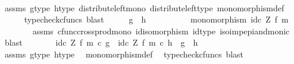 \begin{isabellebody}
\ \ \ \ \isamarkupfalse%
\ assms\ g{\isacharunderscore}{\kern0pt}type\ h{\isacharunderscore}{\kern0pt}type\ distribute{\isacharunderscore}{\kern0pt}left{\isacharunderscore}{\kern0pt}mono\ distribute{\isacharunderscore}{\kern0pt}left{\isacharunderscore}{\kern0pt}type\ monomorphism{\isacharunderscore}{\kern0pt}def{}\isanewline
\ \ \ \ \isamarkupfalse%
\ {\isacharparenleft}{\kern0pt}typecheck{\isacharunderscore}{\kern0pt}cfuncs{\isacharcomma}{\kern0pt}\ blast{\isacharparenright}{\kern0pt}\isanewline
\ \ \isamarkupfalse%
\ \isamarkupfalse%
\ {\isachardoublequoteopen}g\ {\isacharequal}{\kern0pt}\ h{\isachardoublequoteclose}\isanewline
\ \ \isamarkupfalse%
\ {\isacharminus}{\kern0pt}\isanewline
\ \ \ \ \isamarkupfalse%
\ {\isachardoublequoteopen}monomorphism\ {\isacharparenleft}{\kern0pt}id\isactrlsub c\ Z\ {\isasymtimes}\isactrlsub f\ m{\isacharparenright}{\kern0pt}{\isachardoublequoteclose}\isanewline
\ \ \ \ \ \ \isamarkupfalse%
\ assms\ cfunc{\isacharunderscore}{\kern0pt}cross{\isacharunderscore}{\kern0pt}prod{\isacharunderscore}{\kern0pt}mono\ id{\isacharunderscore}{\kern0pt}isomorphism\ id{\isacharunderscore}{\kern0pt}type\ iso{\isacharunderscore}{\kern0pt}imp{\isacharunderscore}{\kern0pt}epi{\isacharunderscore}{\kern0pt}and{\isacharunderscore}{\kern0pt}monic\ \isamarkupfalse%
\ blast\isanewline
\ \ \ \ \isamarkupfalse%
\ \isamarkupfalse%
\ {\isachardoublequoteopen}{\isacharparenleft}{\kern0pt}id\isactrlsub c\ Z\ {\isasymtimes}\isactrlsub f\ m{\isacharparenright}{\kern0pt}\ {\isasymcirc}\isactrlsub c\ g\ {\isacharequal}{\kern0pt}\ {\isacharparenleft}{\kern0pt}id\isactrlsub c\ Z\ {\isasymtimes}\isactrlsub f\ m{\isacharparenright}{\kern0pt}\ {\isasymcirc}\isactrlsub c\ h\ {\isasymLongrightarrow}\ g\ {\isacharequal}{\kern0pt}\ h{\isachardoublequoteclose}\isanewline
\ \ \ \ \ \ \isamarkupfalse%
\ assms\ g{\isacharunderscore}{\kern0pt}type\ h{\isacharunderscore}{\kern0pt}type\ \isamarkupfalse%
\ monomorphism{\isacharunderscore}{\kern0pt}def{}\ \isamarkupfalse%
\ {\isacharparenleft}{\kern0pt}typecheck{\isacharunderscore}{\kern0pt}cfuncs{\isacharcomma}{\kern0pt}\ blast{\isacharparenright}{\kern0pt}\isanewline
\ \ \isamarkupfalse%
\isanewline
{}\isamarkupfalse%
%
\endisatagproof
{\isafoldproof}%
%
\isadelimproof
\isanewline
%
\endisadelimproof
\isanewline
{}\isamarkupfalse%

\end{isabellebody}
